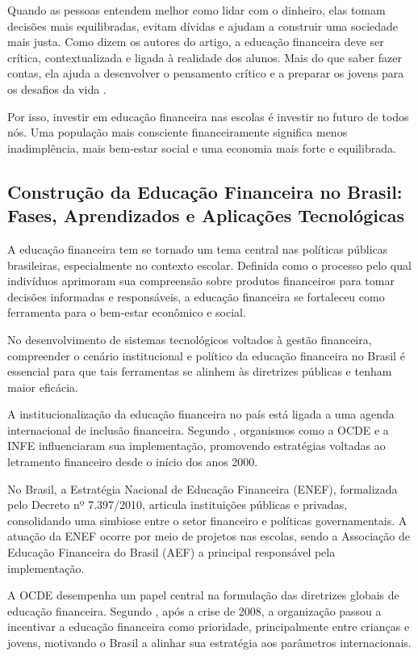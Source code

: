 \documentclass[
	article,			%
	12pt,				%
	oneside,			%
	a4paper,			%
	english,			%
	brazil,				%
	sumario=tradicional
	]{abntex2}
\begin{document}
Quando as pessoas entendem melhor como lidar com o dinheiro, elas tomam decisões mais equilibradas, evitam dívidas e ajudam a construir uma sociedade mais justa. Como dizem os autores do artigo, a educação financeira deve ser crítica, contextualizada e ligada à realidade dos alunos. Mais do que saber fazer contas, ela ajuda a desenvolver o pensamento crítico e a preparar os jovens para os desafios da vida  .

Por isso, investir em educação financeira nas escolas é investir no futuro de todos nós. Uma população mais consciente financeiramente significa menos inadimplência, mais bem-estar social e uma economia mais forte e equilibrada.
    
\subsection{Construção da Educação Financeira no Brasil: Fases, Aprendizados e Aplicações Tecnológicas}
    A educação financeira tem se tornado um tema central nas políticas públicas brasileiras, especialmente no contexto escolar. Definida como o processo pelo qual indivíduos aprimoram sua compreensão sobre produtos financeiros para tomar decisões informadas e responsáveis, a educação financeira se fortaleceu como ferramenta para o bem-estar econômico e social.

    No desenvolvimento de sistemas tecnológicos voltados à gestão financeira, compreender o cenário institucional e político da educação financeira no Brasil é essencial para que tais ferramentas se alinhem às diretrizes públicas e tenham maior eficácia.

    A institucionalização da educação financeira no país está ligada a uma agenda internacional de inclusão financeira. Segundo , organismos como a OCDE e a INFE influenciaram sua implementação, promovendo estratégias voltadas ao letramento financeiro desde o início dos anos 2000.

    No Brasil, a Estratégia Nacional de Educação Financeira (ENEF), formalizada pelo Decreto nº 7.397/2010, articula instituições públicas e privadas, consolidando uma simbiose entre o setor financeiro e políticas governamentais. A atuação da ENEF ocorre por meio de projetos nas escolas, sendo a Associação de Educação Financeira do Brasil (AEF) a principal responsável pela implementação.

    A OCDE desempenha um papel central na formulação das diretrizes globais de educação financeira. Segundo , após a crise de 2008, a organização passou a incentivar a educação financeira como prioridade, principalmente entre crianças e jovens, motivando o Brasil a alinhar sua estratégia aos parâmetros internacionais.
\end{document}
